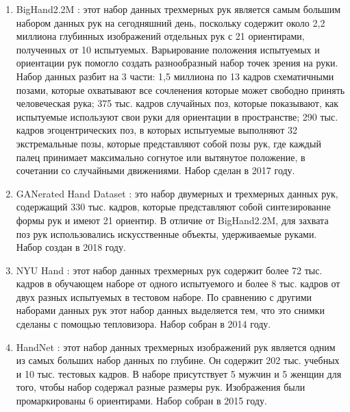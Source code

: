 \begin{enumerate}[label=\arabic*)]
	
	\item BigHand2.2M \cite{BigHand2.2M}: этот набор данных трехмерных рук является самым большим набором данных рук на сегодняшний день, поскольку содержит около 2,2 миллиона глубинных изображений отдельных рук с 21 ориентирами, полученных от 10 испытуемых.
	Варьирование положения испытуемых и ориентации рук помогло создать разнообразный набор точек зрения на руки.
	Набор данных разбит на 3 части: 1,5 миллиона по 13 кадров схематичными позами, которые охватывают все сочленения которые может свободно принять человеческая рука; 375 тыс. кадров случайных поз, которые показывают, как испытуемые используют свои руки для ориентации в пространстве; 290 тыс. кадров эгоцентрических поз, в которых испытуемые выполняют 32 экстремальные позы, которые представляют собой позы рук, где каждый палец принимает максимально согнутое или вытянутое положение, в сочетании со случайными движениями.
	Набор сделан в 2017 году.
	
	\item GANerated Hand Dataset \cite{GANeratedHands_CVPR2018}: это набор двумерных и трехмерных данных рук, содержащий 330 тыс. кадров, которые представляют собой синтезированне формы рук и имеют 21 ориентир.
	В отличие от BigHand2.2M, для захвата поз рук использовались искусственные объекты, удерживаемые руками.
	Набор создан в 2018 году. 
	
	\item NYU Hand \cite{tompson14tog}: этот набор данных трехмерных рук содержит более 72 тыс. кадров в обучающем наборе от одного испытуемого и более 8 тыс. кадров от двух разных испытуемых в тестовом наборе.
	По сравнению с другими наборами данных рук этот набор данных выделяется тем, что это снимки сделаны с помощью тепловизора. 
	Набор собран в 2014 году.
	
	\item HandNet \cite{WetzlerBMVC15}: этот набор данных трехмерных изображений рук является одним из самых больших набор данных по глубине.
	Он содержит 202 тыс. учебных и 10 тыс. тестовых кадров.
	В наборе присутствует 5 мужчин и 5 женщин для того, чтобы набор содержал разные размеры рук.
	Изображения были промаркированы 6 ориентирами.
	Набор собран в 2015 году.
	
	
\end{enumerate}